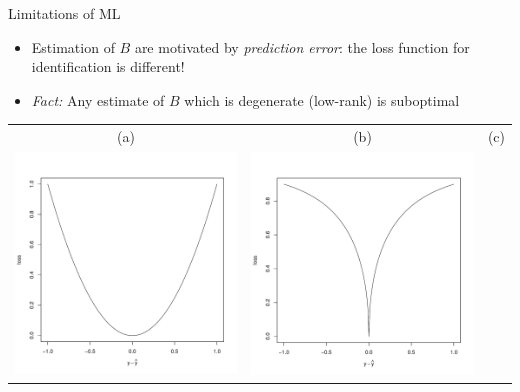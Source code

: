\documentclass[final]{beamer}
\newlength{\onecolwid}
\begin{document}
\begin{frame}[t]
\begin{columns}[t]
\begin{column}{\onecolwid}
\begin{block}{Limitations of ML}
\begin{itemize}
\item Estimation of $B$ are motivated by \emph{prediction error}: the loss function for identification is different!
\item \emph{Fact:} Any estimate of $B$ which is degenerate (low-rank) is suboptimal
\end{itemize}
\begin{center}
\begin{tabular}{ccc}
(a) & (b) & (c)\\
\includegraphics[scale = 0.5, trim = 1in 1in 0.5in 1in, clip]{loss_se.pdf} & 
\includegraphics[scale = 0.5, trim = 1in 1in 0.5in 1in, clip]{loss_3.pdf} &

\end{tabular}
\end{center}
\end{block}
\end{column}
\end{columns}
\end{frame}
\end{document}
